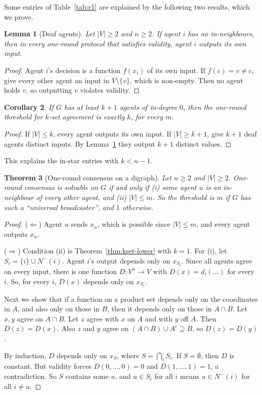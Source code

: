 \documentclass[11pt]{article}
\newtheorem{theorem}{Theorem}
\newtheorem{lemma}[theorem]{Lemma}
\newtheorem{corollary}[theorem]{Corollary}
\begin{document}
Some entries of Table~\ref{tab:r1} are explained by the following two results, which we prove.

\begin{lemma}[Deaf agents]\label{lem:deaf}
Let $|V|\ge2$ and $n\ge2$. If agent $i$ has no in-neighbours, then in every one-round protocol that satisfies validity, agent $i$ outputs its own input.
\end{lemma}
\begin{proof}
Agent $i$'s decision is a function $f(x_i)$ of its own input. If $f(c)=v\neq c$, give every other agent an input in $V\setminus\{v\}$, which is non-empty. Then no agent holds $v$, so outputting $v$ violates validity.
\end{proof}

\begin{corollary}\label{cor:deaf}
If $G$ has at least $k+1$ agents of in-degree $0$, then the one-round threshold for $k$-set agreement is exactly $k$, for every $m$.
\end{corollary}
\begin{proof}
If $|V|\le k$, every agent outputs its own input. If $|V|\ge k+1$, give $k+1$ deaf agents distinct inputs. By Lemma~\ref{lem:deaf} they output $k+1$ distinct values.
\end{proof}
This explains the in-star entries with $k<n-1$.

\begin{theorem}[One-round consensus on a digraph]\label{thm:cons-digraph}
Let $n\ge2$ and $|V|\ge2$. One-round consensus is solvable on $G$ if and only if (i) some agent $u$ is an in-neighbour of every other agent, and (ii) $|V|\le m$. So the threshold is $m$ if $G$ has such a ``universal broadcaster'', and $1$ otherwise.
\end{theorem}
\begin{proof}
($\Leftarrow$) Agent $u$ sends $x_u$, which is possible since $|V|\le m$, and every agent outputs $x_u$.

($\Rightarrow$) Condition (ii) is Theorem~\ref{thm:kset-lower} with $k=1$. For (i), let $S_i=\{i\}\cup N^-(i)$. Agent $i$'s output depends only on $x_{S_i}$. Since all agents agree on every input, there is one function $D:V^n\to V$ with $D(x)=d_i(\dots)$ for every $i$. So, for every $i$, $D(x)$ depends only on $x_{S_i}$.

Next we show that if a function on a product set depends only on the coordinates in $A$, and also only on those in $B$, then it depends only on those in $A\cap B$. Let $x,y$ agree on $A\cap B$. Let $z$ agree with $x$ on $A$ and with $y$ off $A$. Then $D(z)=D(x)$. Also $z$ and $y$ agree on $(A\cap B)\cup A^c\supseteq B$, so $D(z)=D(y)$.

By induction, $D$ depends only on $x_S$, where $S=\bigcap_i S_i$. If $S=\emptyset$, then $D$ is constant. But validity forces $D(0,\dots,0)=0$ and $D(1,\dots,1)=1$, a contradiction. So $S$ contains some $u$, and $u\in S_i$ for all $i$ means $u\in N^-(i)$ for all $i\neq u$.
\end{proof}
\end{document}
